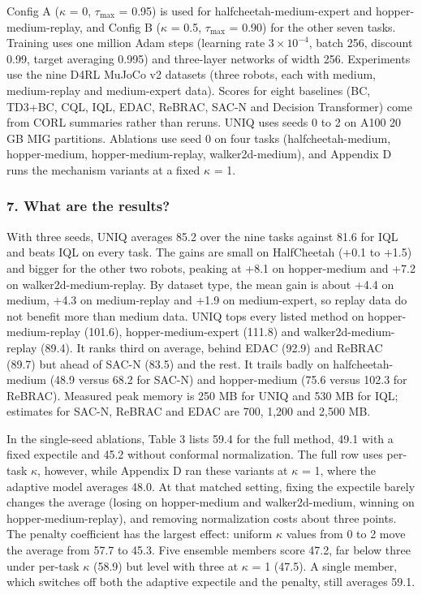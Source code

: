 \documentclass[11pt]{article}
\newcommand{\question}[1]{\subsubsection*{#1}}
\begin{document}
Config A (\ensuremath{\kappa} = 0, $\tau_{\max}$ = 0.95) is used for halfcheetah-medium-expert and hopper-medium-replay, and Config B (\ensuremath{\kappa} = 0.5, $\tau_{\max}$ = 0.90) for the other seven tasks. Training uses one million Adam steps (learning rate $3 \times 10^{-4}$, batch 256, discount 0.99, target averaging 0.995) and three-layer networks of width 256. Experiments use the nine D4RL MuJoCo v2 datasets (three robots, each with medium, medium-replay and medium-expert data). Scores for eight baselines (BC, TD3+BC, CQL, IQL, EDAC, ReBRAC, SAC-N and Decision Transformer) come from CORL summaries rather than reruns. UNIQ uses seeds 0 to 2 on A100 20 GB MIG partitions. Ablations use seed 0 on four tasks (halfcheetah-medium, hopper-medium, hopper-medium-replay, walker2d-medium), and Appendix D runs the mechanism variants at a fixed \ensuremath{\kappa} = 1.

\question{7. What are the results?}

With three seeds, UNIQ averages 85.2 over the nine tasks against 81.6 for IQL and beats IQL on every task. The gains are small on HalfCheetah (+0.1 to +1.5) and bigger for the other two robots, peaking at +8.1 on hopper-medium and +7.2 on walker2d-medium-replay. By dataset type, the mean gain is about +4.4 on medium, +4.3 on medium-replay and +1.9 on medium-expert, so replay data do not benefit more than medium data. UNIQ tops every listed method on hopper-medium-replay (101.6), hopper-medium-expert (111.8) and walker2d-medium-replay (89.4). It ranks third on average, behind EDAC (92.9) and ReBRAC (89.7) but ahead of SAC-N (83.5) and the rest. It trails badly on halfcheetah-medium (48.9 versus 68.2 for SAC-N) and hopper-medium (75.6 versus 102.3 for ReBRAC). Measured peak memory is 250 MB for UNIQ and 530 MB for IQL; estimates for SAC-N, ReBRAC and EDAC are 700, 1,200 and 2,500 MB.

In the single-seed ablations, Table 3 lists 59.4 for the full method, 49.1 with a fixed expectile and 45.2 without conformal normalization. The full row uses per-task \ensuremath{\kappa}, however, while Appendix D ran these variants at \ensuremath{\kappa} = 1, where the adaptive model averages 48.0. At that matched setting, fixing the expectile barely changes the average (losing on hopper-medium and walker2d-medium, winning on hopper-medium-replay), and removing normalization costs about three points. The penalty coefficient has the largest effect: uniform \ensuremath{\kappa} values from 0 to 2 move the average from 57.7 to 45.3. Five ensemble members score 47.2, far below three under per-task \ensuremath{\kappa} (58.9) but level with three at \ensuremath{\kappa} = 1 (47.5). A single member, which switches off both the adaptive expectile and the penalty, still averages 59.1.
\end{document}
